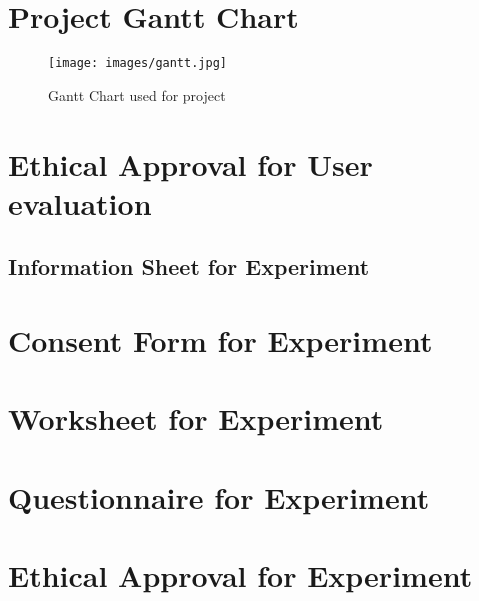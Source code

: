\documentclass[11pt
              , a4paper
              , twoside
              , openright
              ]{report}
\begin{document}












\backmatter

 

%


\appendix
\clearpage
\chapter{Project Gantt Chart}
\label{ap:gantt}
\begin{figure}[H]
  \centering
      \texttt{[image: images/gantt.jpg]}
  \caption{Gantt Chart used for project}
\end{figure}

\chapter{Ethical Approval for User evaluation}
\section{Information Sheet for Experiment}
\label{ap:info}


\chapter{Consent Form for Experiment}
\label{ap:consent}


\chapter{Worksheet for Experiment}
\label{ap:work}


\chapter{Questionnaire for Experiment}
\label{ap:quest}


\chapter{Ethical Approval for Experiment}
\label{ap:approval}

\end{document}
